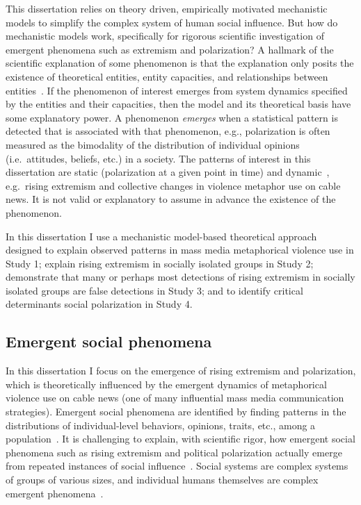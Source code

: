 \documentclass[12pt,letterpaper]{article}
\begin{document}
This dissertation relies on theory driven, empirically motivated mechanistic
models to simplify the complex system of human social influence. But how do
mechanistic models work, specifically for rigorous scientific investigation of
emergent phenomena such as extremism and polarization?
A hallmark of the scientific explanation of some phenomenon is that the explanation
only posits the existence of theoretical entities, entity capacities, 
and relationships between entities~\cite{Kauffman1970,Cartwright1989,Craver2006,Turner2021}. 
If the phenomenon of interest 
emerges from system dynamics specified by the entities and their capacities,
then the model and its theoretical basis have some explanatory power. 
A phenomenon \emph{emerges} when a statistical pattern is detected that is 
associated with that phenomenon, e.g., polarization is often measured as the
bimodality of the distribution of individual opinions (i.e.\ attitudes, beliefs, etc.) in a society.
The patterns of interest in this dissertation are static (polarization at a given
point in time) and dynamic~\cite{Kelso1995}, e.g.\ rising extremism and collective changes in 
violence metaphor use on cable news.
It is not valid or explanatory to assume in advance the existence of the phenomenon. 

In this dissertation I use a mechanistic model-based theoretical
approach designed to explain observed patterns in mass media metaphorical violence use in
Study 1;
explain rising extremism in socially isolated groups in Study 2; 
demonstrate that many or perhaps most detections of
rising extremism in socially isolated groups are false detections in Study 3; and 
to identify critical determinants social polarization in Study 4.


\subsection{Emergent social phenomena}

In this dissertation I focus on the emergence of rising extremism and polarization,
which is theoretically influenced by the emergent dynamics of metaphorical violence
use on cable news (one of many influential mass media communication strategies). 
Emergent social phenomena are identified by finding patterns in
the distributions of individual-level behaviors, opinions, traits, etc., 
among a population~\cite{Blau1974,Schelling2006}. It is challenging to
explain, with scientific rigor, how emergent social phenomena such as
rising extremism and political polarization actually 
emerge from repeated instances of social influence~\cite{Watts2011}. Social systems are
complex systems of groups of various sizes, and individual humans themselves
are complex emergent phenomena~\cite{Kello2007,Lazer2009}. 
\end{document}
